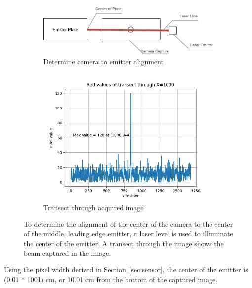 \documentclass[12pt]{article}
\begin{document}
\begin{figure}[H]
	\centering
	\begin{subfigure}[t]{.38\textwidth}
		\centering
		\includegraphics[width=1\linewidth]{./figures/camera-to-emitter.jpg}
		\caption{Determine camera to emitter alignment}
		\label{fig:camera-to-emitter-alignment}
	\end{subfigure}
	\hspace{1em}%
	\begin{subfigure}[t]{.38\textwidth}
		\centering
		\includegraphics[width=1\linewidth]{./figures/transect-for-laser.jpeg}
		\caption{Transect through acquired image}
		\label{fig:laser-transect}
	\end{subfigure}
	\caption[Determining camera to emitter alignment]{To determine the alignment of the center of the camera to the center of the middle, leading edge emitter, a laser level is used to illuminate the center of the emitter. A transect through the image shows the beam captured in the image.}
	\label{fig:camera-to-emitter}
\end{figure}
Using the pixel width derived in Section~\ref{sec:sensor}, the center of the emitter is (0.01 * 1001) cm, or 10.01 cm from the bottom of the captured image.
\end{document}
